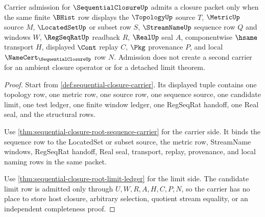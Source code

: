 \begin{theorem}
\label{thm:sequentialclosure-carrier-admission-scope}
Carrier admission for $\SequentialClosureUp$ admits a closure packet only when the same finite $\BHist$ row displays the $\TopologyUp$ source $T$, $\MetricUp$ source $M$, $\LocatedSetUp$ or subset row $S$, $\StreamNameUp$ sequence row $Q$ and windows $W$, $\RegSeqRatUp$ readback $R$, $\RealUp$ seal $A$, componentwise $\hsame$ transport $H$, displayed $\Cont$ replay $C$, $\Pkg$ provenance $P$, and local $\NameCert_{\SequentialClosureUp}$ row $N$. Admission does not create a second carrier for an ambient closure operator or for a detached limit theorem.
\end{theorem}
\begin{proof}
Start from \autoref{def:sequential-closure-carrier}. Its displayed tuple contains one topology row, one metric row, one source row, one sequence source, one candidate limit, one test ledger, one finite window ledger, one RegSeqRat handoff, one Real seal, and the structural rows.

Use \autoref{thm:sequential-closure-root-sequence-carrier} for the carrier side. It binds the sequence row to the LocatedSet or subset source, the metric row, StreamName windows, RegSeqRat handoff, Real seal, transport, replay, provenance, and local naming rows in the same packet.

Use \autoref{thm:sequential-closure-root-limit-ledger} for the limit side. The candidate limit row is admitted only through $U,W,R,A,H,C,P,N$, so the carrier has no place to store host closure, arbitrary selection, quotient stream equality, or an independent completeness proof.
\end{proof}


